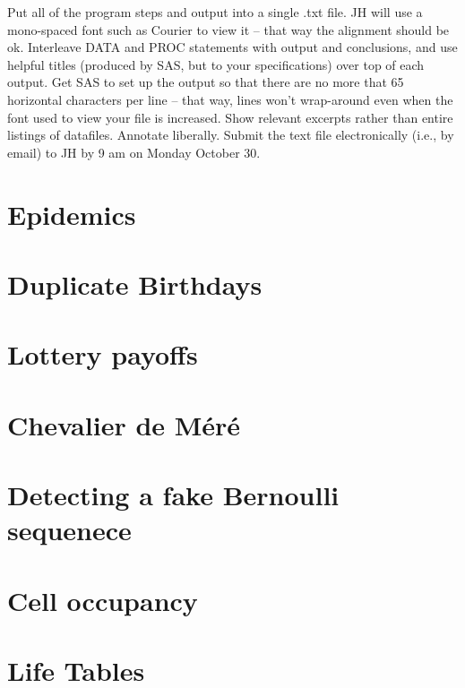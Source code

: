 \documentclass[]{book}
\begin{document}
Put all of the program steps and output into a single .txt file. JH will use a mono-spaced font such as Courier to view it -- that way the alignment should be ok. Interleave DATA and PROC statements with output and conclusions, and use helpful titles (produced by SAS, but to your specifications) over top of each output. Get SAS to set up the output so that there are no more that 65 horizontal characters per line -- that way, lines won't wrap-around even when the font used to view your file is increased. Show relevant excerpts rather than entire listings of datafiles. Annotate liberally. Submit the text file electronically (i.e., by email) to JH by 9 am on Monday October 30.

\hypertarget{epidemics-1}{%
\section{Epidemics}\label{epidemics-1}}

\hypertarget{duplicate-birthdays-1}{%
\section{Duplicate Birthdays}\label{duplicate-birthdays-1}}

\hypertarget{lottery-payoffs-1}{%
\section{Lottery payoffs}\label{lottery-payoffs-1}}

\hypertarget{chevalier-de-muxe9ruxe9-1}{%
\section{Chevalier de Méré}\label{chevalier-de-muxe9ruxe9-1}}

\hypertarget{detecting-a-fake-bernoulli-sequenece-1}{%
\section{Detecting a fake Bernoulli sequenece}\label{detecting-a-fake-bernoulli-sequenece-1}}

\hypertarget{cell-occupancy-1}{%
\section{Cell occupancy}\label{cell-occupancy-1}}

\hypertarget{life-tables-1}{%
\section{Life Tables}\label{life-tables-1}}
\end{document}
